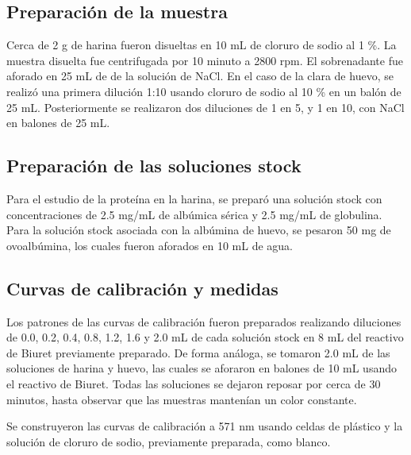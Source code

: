\documentclass[fleqn,10pt]{SelfArx}
\begin{document}
	\subsection{Preparaci\'on de la muestra}
		Cerca de 2 g de harina fueron disueltas en 10 mL de cloruro de sodio al 1 \%. La muestra disuelta fue centrifugada por 10 minuto a 2800 rpm. El sobrenadante fue aforado en 25 mL de de la soluci\'on de NaCl. En el caso de la clara de huevo, se realiz\'o una primera diluci\'on 1:10 usando cloruro de sodio al 10 \% en un bal\'on de 25 mL. Posteriormente se realizaron dos diluciones de 1 en 5, y 1 en 10, con NaCl en balones de 25 mL.
		
		\newpage
		
	\subsection{Preparaci\'on de las soluciones stock}
		Para el estudio de la prote\'ina en la harina, se prepar\'o una soluci\'on stock con concentraciones de 2.5 mg/mL de alb\'umica s\'erica y 2.5 mg/mL de globulina. Para la soluci\'on stock asociada con la alb\'umina de huevo, se pesaron 50 mg de ovoalb\'umina, los cuales fueron aforados en 10 mL de agua.

	\subsection{Curvas de calibraci\'on y medidas}
		Los patrones de las curvas de calibraci\'on fueron preparados realizando diluciones de 0.0, 0.2, 0.4, 0.8, 1.2, 1.6 y 2.0 mL de cada soluci\'on stock en 8 mL del reactivo de Biuret previamente preparado. De forma an\'aloga, se tomaron 2.0 mL de las soluciones de harina y huevo, las cuales se aforaron en balones de 10 mL usando el reactivo de Biuret. Todas las soluciones se dejaron reposar por cerca de 30 minutos, hasta observar que las muestras manten\'ian un color constante.
		
		Se construyeron las curvas de calibraci\'on a 571 nm usando celdas de pl\'astico y la soluci\'on de cloruro de sodio, previamente preparada, como blanco.
	
\end{document}
